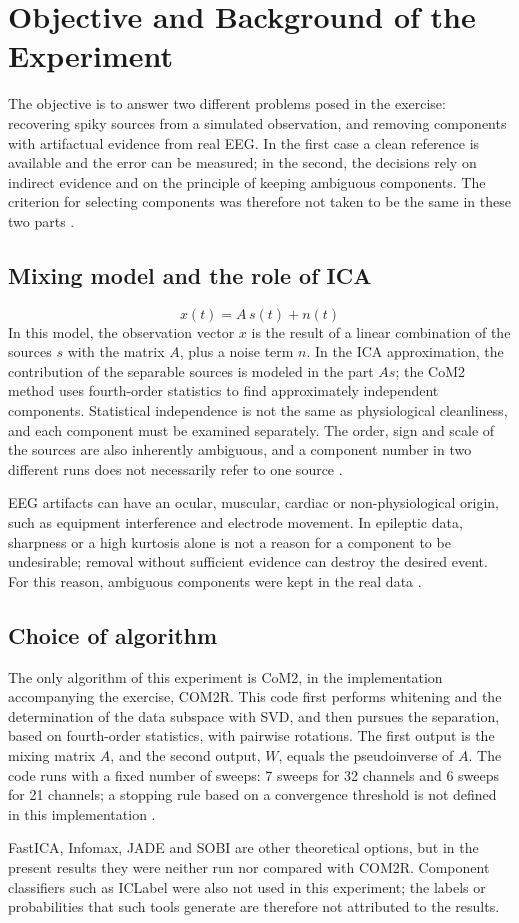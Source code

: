 \section{Objective and Background of the Experiment}

The objective is to answer two different problems posed in the exercise: recovering spiky sources from a simulated observation, and removing components with artifactual evidence from real EEG. In the first case a clean reference is available and the error can be measured; in the second, the decisions rely on indirect evidence and on the principle of keeping ambiguous components. The criterion for selecting components was therefore not taken to be the same in these two parts .

\subsection*{Mixing model and the role of ICA}
\begin{equation}
x(t)=A\,s(t)+n(t)
\end{equation}
In this model, the observation vector $x$ is the result of a linear combination of the sources $s$ with the matrix $A$, plus a noise term $n$. In the ICA approximation, the contribution of the separable sources is modeled in the part $As$; the CoM2 method uses fourth-order statistics to find approximately independent components. Statistical independence is not the same as physiological cleanliness, and each component must be examined separately. The order, sign and scale of the sources are also inherently ambiguous, and a component number in two different runs does not necessarily refer to one source .

EEG artifacts can have an ocular, muscular, cardiac or non-physiological origin, such as equipment interference and electrode movement. In epileptic data, sharpness or a high kurtosis alone is not a reason for a component to be undesirable; removal without sufficient evidence can destroy the desired event. For this reason, ambiguous components were kept in the real data .

\subsection*{Choice of algorithm}

The only algorithm of this experiment is CoM2, in the implementation accompanying the exercise, COM2R. This code first performs whitening and the determination of the data subspace with SVD, and then pursues the separation, based on fourth-order statistics, with pairwise rotations. The first output is the mixing matrix $A$, and the second output, $W$, equals the pseudoinverse of $A$. The code runs with a fixed number of sweeps: 7 sweeps for 32 channels and 6 sweeps for 21 channels; a stopping rule based on a convergence threshold is not defined in this implementation .

FastICA, Infomax, JADE and SOBI are other theoretical options, but in the present results they were neither run nor compared with COM2R. Component classifiers such as ICLabel were also not used in this experiment; the labels or probabilities that such tools generate are therefore not attributed to the results.
